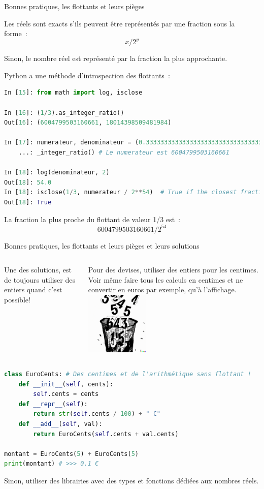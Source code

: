 \documentclass{beamer}
\begin{document}
    \begin{frame}[fragile]{Bonnes pratiques, les flottants et leurs pièges}

        Les réels sont exacts s'ils peuvent être représentés par une fraction sous la forme~:\[ x / 2^y \]

        Sinon, le nombre réel est représenté par la fraction la plus approchante.

        Python a une méthode d'introspection des flottants~:

        \begin{lstlisting}[language=python]
In [15]: from math import log, isclose

In [16]: (1/3).as_integer_ratio()
Out[16]: (6004799503160661, 18014398509481984)

In [17]: numerateur, denominateur = (0.3333333333333333333333333333333333333).as
    ...: _integer_ratio() # Le numerateur est 6004799503160661

In [18]: log(denominateur, 2)
Out[18]: 54.0
In [18]: isclose(1/3, numerateur / 2**54)  # True if the closest fraction
Out[18]: True
        \end{lstlisting}

        La fraction la plus proche du flottant de valeur 1/3 est~:\[ 6004799503160661 / 2^{54} \]

    \end{frame}

    \begin{frame}[fragile]{Bonnes pratiques, les flottants et leurs pièges et leurs solutions}

        \begin{columns}
            Une des solutions, est de toujours utiliser des entiers quand c'est possible!

            Pour des devises, utiliser des entiers pour les centimes.
            Voir même faire tous les calculs en centimes et ne convertir en euros par exemple, qu'à l'affichage.
            \centering
            \includegraphics[width=3cm]{image/numbers-throwned-in-the-trash}

        \end{columns}
        \begin{lstlisting}[language=python]
class EuroCents: # Des centimes et de l'arithmétique sans flottant !
    def __init__(self, cents):
        self.cents = cents
    def __repr__(self):
        return str(self.cents / 100) + " €"
    def __add__(self, val):
        return EuroCents(self.cents + val.cents)

montant = EuroCents(5) + EuroCents(5)
print(montant) # >>> 0.1 €
        \end{lstlisting}

        Sinon, utiliser des librairies avec des types et fonctions dédiées aux nombres réels.
    \end{frame}
\end{document}
